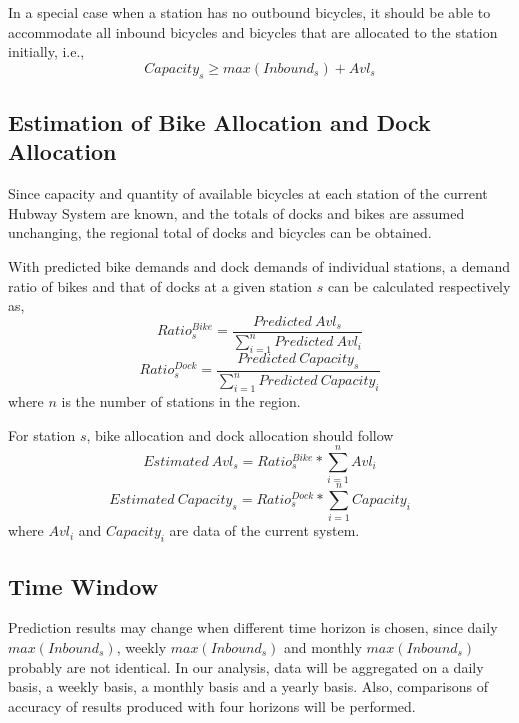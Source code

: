 \documentclass[journal, letterpaper]{IEEEtran}
\begin{document}
In a special case when a station has no outbound bicycles, it should be able to accommodate all inbound bicycles and bicycles that are allocated to the station initially, i.e., 
$$Capacity_{s} \ge max(Inbound_{s}) + Avl_{s}$$
\subsection{Estimation of Bike Allocation and Dock Allocation}
Since capacity and quantity of available bicycles at each station of the current Hubway System are known, and the totals of docks and bikes are assumed unchanging, the regional total of docks and bicycles can be obtained. 

With predicted bike demands and dock demands of individual stations, a demand ratio of bikes and that of docks at a given station $s$ can be calculated respectively as, 
$$Ratio_{s}^{Bike} = \frac{Predicted \ Avl_{s}}{\sum_{i=1}^{n}Predicted \ Avl_{i}}$$
$$Ratio_{s}^{Dock} = \frac{Predicted \ Capacity_{s}}{\sum_{i=1}^{n}Predicted \ Capacity_{i}}$$
where $n$ is the number of stations in the region.

For station $s$, bike allocation and dock allocation should follow
$$Estimated \ Avl_{s} = Ratio_{s}^{Bike} * \sum_{i=1}^{n}Avl_{i}$$
$$Estimated \ Capacity_{s} = Ratio_{s}^{Dock} * \sum_{i=1}^{n}Capacity_{i}$$
where $Avl_{i}$ and $Capacity_{i}$ are data of the current system.
\subsection{Time Window}
Prediction results may change when different time horizon is chosen, since daily $max(Inbound_{s})$, weekly $max(Inbound_{s})$ and monthly $max(Inbound_{s})$ probably are not identical. In our analysis, data will be aggregated on a daily basis, a weekly basis, a monthly basis and a yearly basis. Also, comparisons of accuracy of results produced with four horizons will be performed.
\end{document}
